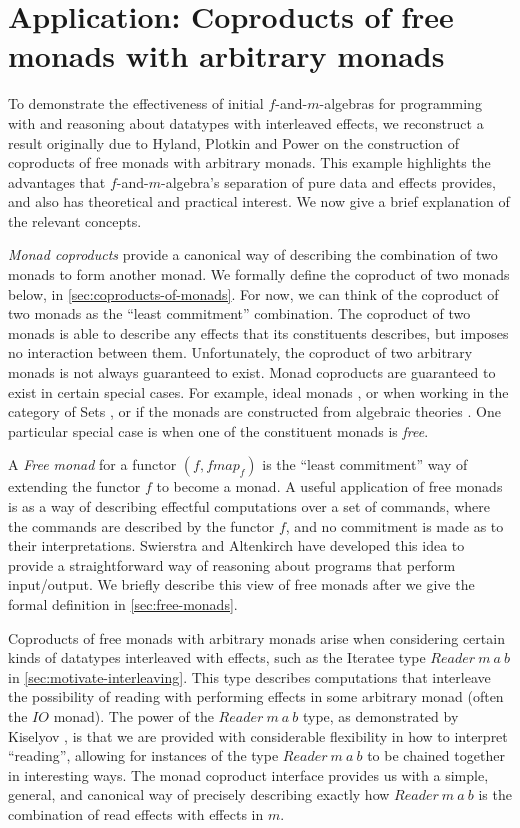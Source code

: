 \documentclass{jfp1}
\begin{document}
\section{Application: Coproducts of free monads with arbitrary monads}
\label{sec:coproducts-with-free-monads}

To demonstrate the effectiveness of initial $f$-and-$m$-algebras for
programming with and reasoning about datatypes with interleaved
effects, we reconstruct a result originally due to Hyland, Plotkin and
Power \cite{hyland06combining} on the construction of coproducts of
free monads with arbitrary monads. This example highlights the
advantages that $f$-and-$m$-algebra's separation of pure data and
effects provides, and also has theoretical and practical interest. We
now give a brief explanation of the relevant concepts.

\emph{Monad coproducts} provide a canonical way of describing the
combination of two monads to form another monad. We formally define
the coproduct of two monads below, in
\autoref{sec:coproducts-of-monads}. For now, we can think of the
coproduct of two monads as the ``least commitment'' combination. The
coproduct of two monads is able to describe any effects that its
constituents describes, but imposes no interaction between
them. Unfortunately, the coproduct of two arbitrary monads is not
always guaranteed to exist. Monad coproducts are guaranteed to exist
in certain special cases. For example, ideal monads
\cite{ghani04coproducts}, or when working in the category of Sets
\cite{adamek12coproducts}, or if the monads are constructed from
algebraic theories \cite{hyland06combining}. One particular special
case is when one of the constituent monads is \emph{free}.

A \emph{Free monad} for a functor $(f, \mathit{fmap}_f)$ is the
``least commitment'' way of extending the functor $f$ to become a
monad. A useful application of free monads is as a way of describing
effectful computations over a set of commands, where the commands are described by the
functor $f$, and no commitment is made as to their interpretations. Swierstra and Altenkirch \cite{swierstra07beauty} have
developed this idea to provide a straightforward way of reasoning
about programs that perform input/output. We briefly describe this
view of free monads after we give the formal definition in
\autoref{sec:free-monads}.

Coproducts of free monads with arbitrary monads arise when considering
certain kinds of datatypes interleaved with effects, such as the
Iteratee type $\mathit{Reader}~m~a~b$ in
\autoref{sec:motivate-interleaving}. This type describes computations
that interleave the possibility of reading with performing effects in
some arbitrary monad (often the $\mathit{IO}$ monad). The power of the
$\mathit{Reader}~m~a~b$ type, as demonstrated by Kiselyov
\cite{kiselyov12iteratees}, is that we are provided with considerable
flexibility in how to interpret ``reading'', allowing for instances of
the type $\mathit{Reader}~m~a~b$ to be chained together in interesting
ways. The monad coproduct interface provides us with a simple,
general, and canonical way of precisely describing exactly how
$\mathit{Reader}~m~a~b$ is the combination of read effects with
effects in $m$.
\end{document}
